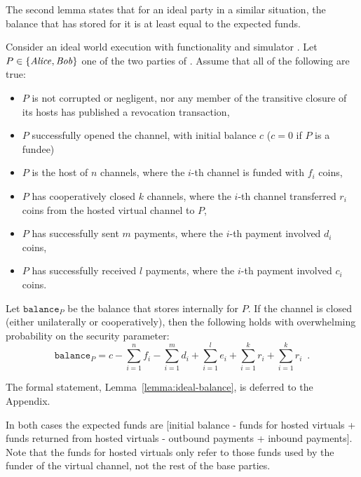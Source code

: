   The second lemma states that for an ideal party in a
  similar situation, the balance that \fchan has stored for it is at least equal
  to the expected funds.

\begin{lemma}
\label{lemma:ideal-balance-informal}
  Consider an ideal world execution with functionality \fchan and simulator
  \simulator. Let $P \in \{\mathit{Alice}, \mathit{Bob}\}$ one of the two parties of \fchan.
  Assume that all of the following are true:
  \begin{itemize}
    \item $P$ is not corrupted or negligent, nor any member of the
    transitive closure of its hosts has published a revocation transaction,
    \item $P$ successfully opened the channel, with initial balance $c$ ($c = 0$
    if $P$ is a fundee)
    \item $P$ is the host of $n$ channels, where the $i$-th channel is funded
    with $f_i$ coins,
    \item $P$ has cooperatively closed $k$ channels, where the $i$-th channel
    transferred $r_i$ coins from the hosted virtual channel to $P$,
    \item $P$ has successfully sent $m$ payments, where the $i$-th payment
    involved $d_i$ coins,
    \item $P$ has successfully received $l$ payments, where the $i$-th payment
    involved $c_i$ coins.
  \end{itemize}
  Let $\texttt{balance}_P$ be the balance that \fchan stores internally for $P$.
  If the channel is closed (either unilaterally or cooperatively), then the
  following holds with overwhelming probability on the security parameter:
  \begin{equation}
    \texttt{balance}_P = c - \sum\limits_{i=1}^n f_i - \sum\limits_{i=1}^m d_i +
    \sum\limits_{i=1}^l e_i + \sum\limits_{i=1}^k r_i + \sum\limits_{i=1}^k r_i
    \enspace.
  \end{equation}
\end{lemma}
The formal statement, Lemma~\ref{lemma:ideal-balance}, is deferred to the
Appendix.

  In both cases the expected funds are [initial balance - funds for hosted
  virtuals + funds returned from hosted virtuals - outbound payments + inbound
  payments]. Note that the funds for hosted virtuals only refer to those funds
  used by the funder of the virtual channel, not the rest of the base parties.

